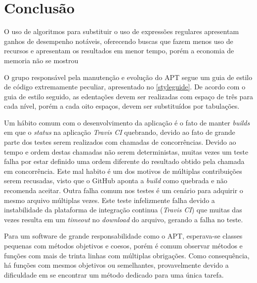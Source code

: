 \chapter{Conclusão} %
\label{cha:dificuldades_encontradas}


O uso de algoritmos para substituir o uso de expressões regulares apresentam ganhos de desempenho notáveis, oferecendo buscas que fazem menos uso de recursos e apresentam os resultados em menor tempo, porém a economia de memoria não se mostrou  


O grupo responsável pela manutenção e evolução do APT segue um guia de estilo de código extremamente peculiar, apresentado no \autoref{styleguide}. De acordo com o guia de estilo seguido, as edentações devem ser realizadas com espaço de três para cada nível, porém a cada oito espaços, devem ser substituídos por tabulações.


Um hábito comum com o desenvolvimento da aplicação é o fato de manter \textit{builds} em que o \textit{status} na aplicação \textit{Travis CI} quebrando, devido ao fato de grande parte dos testes serem realizados com chamadas de concorrências. Devido ao tempo e ordem destas chamadas não serem deterministas, muitas vezes um teste falha por estar definido uma ordem diferente do resultado obtido pela chamada em concorrência.
Este mal habito é um dos motivos de múltiplas contribuições serem recusadas, visto que o GitHub aponta a \textit{build} como quebrada e não recomenda aceitar. Outra falha comum nos testes é um cenário para adquirir o mesmo arquivo múltiplas vezes. Este teste infelizmente falha devido a instabilidade da plataforma de integração continua (\textit{Travis CI}) que muitas das vezes resulta em um \textit{timeout} no \textit{download} do arquivo, gerando a falha no teste.



Para um software de grande responsabilidade como o APT, esperava-se classes pequenas com métodos objetivos e coesos, porém é comum observar métodos e funções com mais de trinta linhas com múltiplas obrigações. Como consequência, há funções com mesmos objetivos ou semelhantes, provavelmente devido a dificuldade em se encontrar um método dedicado para uma única tarefa.

